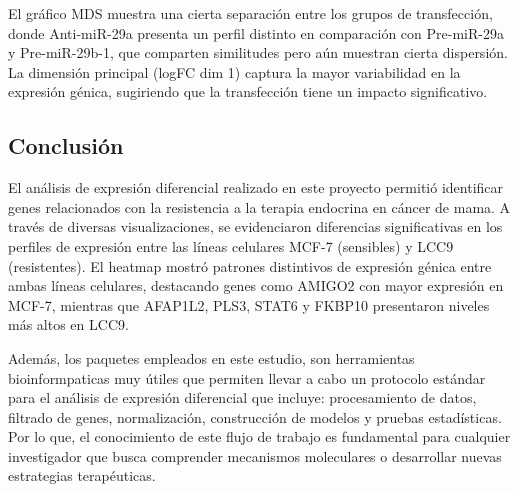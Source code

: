 \documentclass[
]{article}
\begin{document}
El gráfico MDS muestra una cierta separación entre los grupos de
transfección, donde Anti-miR-29a presenta un perfil distinto en
comparación con Pre-miR-29a y Pre-miR-29b-1, que comparten similitudes
pero aún muestran cierta dispersión. La dimensión principal (logFC dim
1) captura la mayor variabilidad en la expresión génica, sugiriendo que
la transfección tiene un impacto significativo.

\subsection{Conclusión}\label{conclusiuxf3n}

El análisis de expresión diferencial realizado en este proyecto permitió
identificar genes relacionados con la resistencia a la terapia endocrina
en cáncer de mama. A través de diversas visualizaciones, se evidenciaron
diferencias significativas en los perfiles de expresión entre las líneas
celulares MCF-7 (sensibles) y LCC9 (resistentes). El heatmap mostró
patrones distintivos de expresión génica entre ambas líneas celulares,
destacando genes como AMIGO2 con mayor expresión en MCF-7, mientras que
AFAP1L2, PLS3, STAT6 y FKBP10 presentaron niveles más altos en LCC9.

Además, los paquetes empleados en este estudio, son herramientas
bioinformpaticas muy útiles que permiten llevar a cabo un protocolo
estándar para el análisis de expresión diferencial que incluye:
procesamiento de datos, filtrado de genes, normalización, construcción
de modelos y pruebas estadísticas. Por lo que, el conocimiento de este
flujo de trabajo es fundamental para cualquier investigador que busca
comprender mecanismos moleculares o desarrollar nuevas estrategias
terapéuticas.
\end{document}

